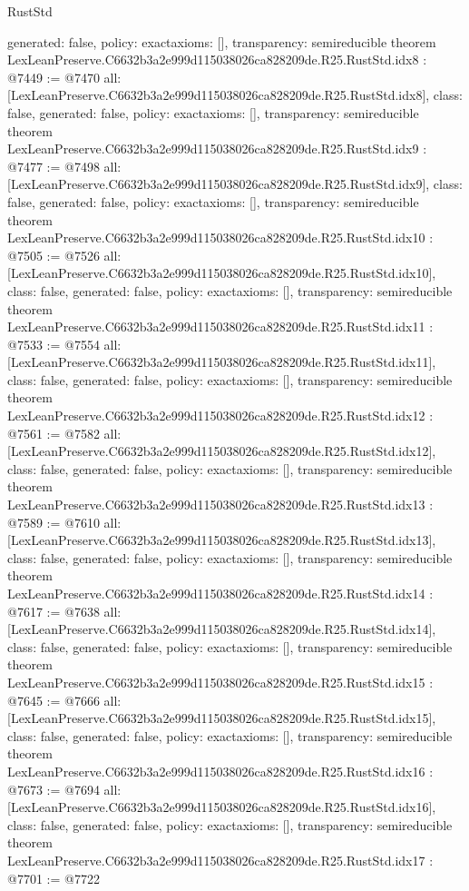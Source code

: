\begin{lexlean}{RustStd}
\begin{coremodule}
{  generated: false,
  policy: exact{axioms: []},
  transparency: semireducible
}
theorem LexLeanPreserve.C6632b3a2e999d115038026ca828209de.R25.RustStd.idx8 : @7449 := @7470 {
  all: [LexLeanPreserve.C6632b3a2e999d115038026ca828209de.R25.RustStd.idx8],
  class: false,
  generated: false,
  policy: exact{axioms: []},
  transparency: semireducible
}
theorem LexLeanPreserve.C6632b3a2e999d115038026ca828209de.R25.RustStd.idx9 : @7477 := @7498 {
  all: [LexLeanPreserve.C6632b3a2e999d115038026ca828209de.R25.RustStd.idx9],
  class: false,
  generated: false,
  policy: exact{axioms: []},
  transparency: semireducible
}
theorem LexLeanPreserve.C6632b3a2e999d115038026ca828209de.R25.RustStd.idx10 : @7505 := @7526 {
  all: [LexLeanPreserve.C6632b3a2e999d115038026ca828209de.R25.RustStd.idx10],
  class: false,
  generated: false,
  policy: exact{axioms: []},
  transparency: semireducible
}
theorem LexLeanPreserve.C6632b3a2e999d115038026ca828209de.R25.RustStd.idx11 : @7533 := @7554 {
  all: [LexLeanPreserve.C6632b3a2e999d115038026ca828209de.R25.RustStd.idx11],
  class: false,
  generated: false,
  policy: exact{axioms: []},
  transparency: semireducible
}
theorem LexLeanPreserve.C6632b3a2e999d115038026ca828209de.R25.RustStd.idx12 : @7561 := @7582 {
  all: [LexLeanPreserve.C6632b3a2e999d115038026ca828209de.R25.RustStd.idx12],
  class: false,
  generated: false,
  policy: exact{axioms: []},
  transparency: semireducible
}
theorem LexLeanPreserve.C6632b3a2e999d115038026ca828209de.R25.RustStd.idx13 : @7589 := @7610 {
  all: [LexLeanPreserve.C6632b3a2e999d115038026ca828209de.R25.RustStd.idx13],
  class: false,
  generated: false,
  policy: exact{axioms: []},
  transparency: semireducible
}
theorem LexLeanPreserve.C6632b3a2e999d115038026ca828209de.R25.RustStd.idx14 : @7617 := @7638 {
  all: [LexLeanPreserve.C6632b3a2e999d115038026ca828209de.R25.RustStd.idx14],
  class: false,
  generated: false,
  policy: exact{axioms: []},
  transparency: semireducible
}
theorem LexLeanPreserve.C6632b3a2e999d115038026ca828209de.R25.RustStd.idx15 : @7645 := @7666 {
  all: [LexLeanPreserve.C6632b3a2e999d115038026ca828209de.R25.RustStd.idx15],
  class: false,
  generated: false,
  policy: exact{axioms: []},
  transparency: semireducible
}
theorem LexLeanPreserve.C6632b3a2e999d115038026ca828209de.R25.RustStd.idx16 : @7673 := @7694 {
  all: [LexLeanPreserve.C6632b3a2e999d115038026ca828209de.R25.RustStd.idx16],
  class: false,
  generated: false,
  policy: exact{axioms: []},
  transparency: semireducible
}
theorem LexLeanPreserve.C6632b3a2e999d115038026ca828209de.R25.RustStd.idx17 : @7701 := @7722 {
}
\end{coremodule}
\end{lexlean}
